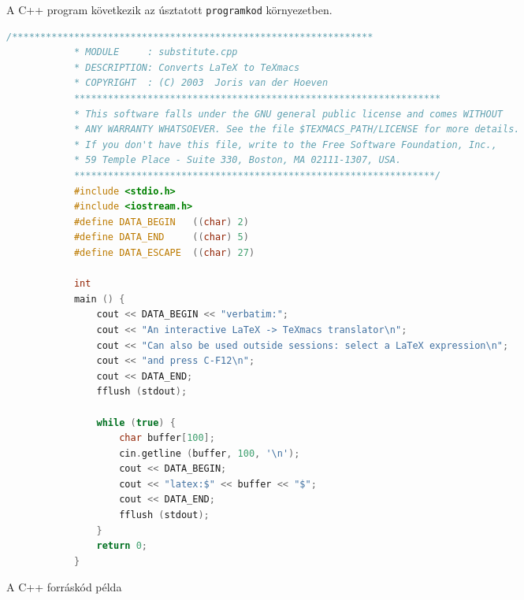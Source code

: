 \documentclass{article}
\begin{document}
A C++ program következik az úsztatott \verb!programkod! környezetben.
\begin{programkod}[!h]
	{\centering
		\begin{lstlisting}[language=C++]
			/****************************************************************
			* MODULE     : substitute.cpp
			* DESCRIPTION: Converts LaTeX to TeXmacs
			* COPYRIGHT  : (C) 2003  Joris van der Hoeven
			*****************************************************************
			* This software falls under the GNU general public license and comes WITHOUT
			* ANY WARRANTY WHATSOEVER. See the file $TEXMACS_PATH/LICENSE for more details.
			* If you don't have this file, write to the Free Software Foundation, Inc.,
			* 59 Temple Place - Suite 330, Boston, MA 02111-1307, USA.
			****************************************************************/
			#include <stdio.h>
			#include <iostream.h>
			#define DATA_BEGIN   ((char) 2)
			#define DATA_END     ((char) 5)
			#define DATA_ESCAPE  ((char) 27)
			
			int
			main () {
				cout << DATA_BEGIN << "verbatim:";
				cout << "An interactive LaTeX -> TeXmacs translator\n";
				cout << "Can also be used outside sessions: select a LaTeX expression\n";
				cout << "and press C-F12\n";
				cout << DATA_END;
				fflush (stdout);
				
				while (true) {
					char buffer[100];
					cin.getline (buffer, 100, '\n');
					cout << DATA_BEGIN;
					cout << "latex:$" << buffer << "$";
					cout << DATA_END;
					fflush (stdout);
				}
				return 0;
			}
		\end{lstlisting}
		\caption{A C++ forráskód példa}
	}
\end{programkod}
\end{document}
